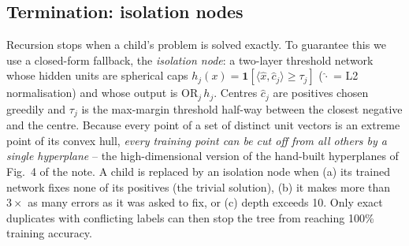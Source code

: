 \subsection{Termination: isolation nodes}
Recursion stops when a child's problem is solved exactly. To guarantee this we use a closed-form
fallback, the \emph{isolation node}: a two-layer threshold network whose hidden units are spherical
caps $h_j(x)=\mathbf{1}[\langle \hat x, \hat c_j\rangle\ge\tau_j]$ ($\hat{\cdot}$ = L2 normalisation)
and whose output is $\mathrm{OR}_j\,h_j$. Centres $\hat c_j$ are positives chosen greedily and
$\tau_j$ is the max-margin threshold half-way between the closest negative and the centre.
Because every point of a set of distinct unit vectors is an extreme point of its convex hull,
\emph{every training point can be cut off from all others by a single hyperplane} -- the
high-dimensional version of the hand-built hyperplanes of Fig.~4 of the note. A child is replaced by
an isolation node when (a) its trained network fixes none of its positives (the trivial solution), (b) it
makes more than $3\times$ as many errors as it was asked to fix, or (c) depth exceeds 10. Only exact
duplicates with conflicting labels can then stop the tree from reaching 100\% training accuracy.

